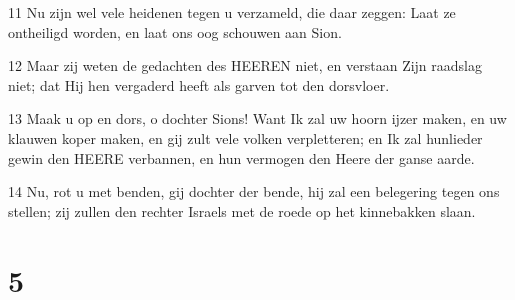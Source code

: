 \par 11 Nu zijn wel vele heidenen tegen u verzameld, die daar zeggen: Laat ze ontheiligd worden, en laat ons oog schouwen aan Sion.
\par 12 Maar zij weten de gedachten des HEEREN niet, en verstaan Zijn raadslag niet; dat Hij hen vergaderd heeft als garven tot den dorsvloer.
\par 13 Maak u op en dors, o dochter Sions! Want Ik zal uw hoorn ijzer maken, en uw klauwen koper maken, en gij zult vele volken verpletteren; en Ik zal hunlieder gewin den HEERE verbannen, en hun vermogen den Heere der ganse aarde.
\par 14 Nu, rot u met benden, gij dochter der bende, hij zal een belegering tegen ons stellen; zij zullen den rechter Israels met de roede op het kinnebakken slaan.

\chapter{5}

